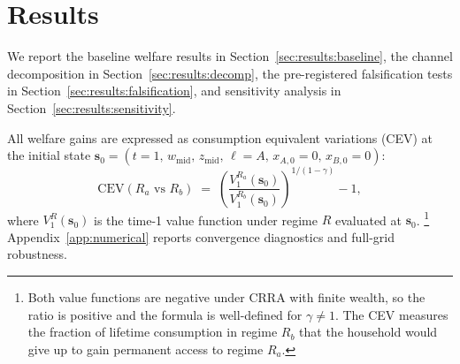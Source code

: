 %
%
%

\section{Results}
\label{sec:results}

We report the baseline welfare results in Section~\ref{sec:results:baseline},
the channel decomposition in Section~\ref{sec:results:decomp}, the
pre-registered falsification tests in Section~\ref{sec:results:falsification},
and sensitivity analysis in Section~\ref{sec:results:sensitivity}.

All welfare gains are expressed as consumption equivalent variations (CEV) at the
initial state
$\mathbf{s}_0 = (t{=}1,\,w_{\text{mid}},\,z_{\text{mid}},\,\ell{=}A,\,x_{A,0}{=}0,\,x_{B,0}{=}0)$:
\begin{equation}
    \text{CEV}(R_a \text{ vs } R_b) \;=\;
    \left(\frac{V_1^{R_a}(\mathbf{s}_0)}{V_1^{R_b}(\mathbf{s}_0)}\right)^{1/(1-\gamma)}
    - 1,
    \label{eq:cev}
\end{equation}
where $V_1^{R}(\mathbf{s}_0)$ is the time-1 value function under regime $R$
evaluated at $\mathbf{s}_0$.%
\footnote{Both value functions are negative under CRRA with finite wealth,
so the ratio is positive and the formula is well-defined for $\gamma \neq 1$.
The CEV measures the fraction of lifetime consumption in regime $R_b$ that the
household would give up to gain permanent access to regime $R_a$.}
Appendix~\ref{app:numerical} reports convergence diagnostics and full-grid
robustness.

